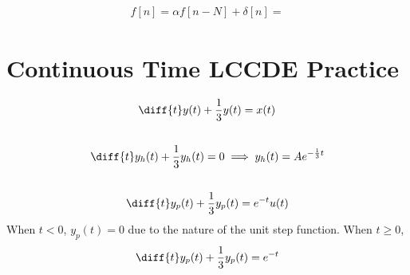 \documentclass{article}
\begin{document}
\subsection{}

\begin{align}
    f[n] = \alpha f[n - N] + \delta[n] =
\end{align}

\subsection{}

\subsection{}

\section{Continuous Time LCCDE Practice}

\begin{equation}
    \diff{t} y(t) + \frac{1}{3} y(t) = x(t)
\end{equation}

\subsection{}

\begin{equation}
    \diff{t} y_h(t) + \frac{1}{3} y_h(t) = 0 \implies y_h(t) = A e^{-\frac{1}{3} t}
\end{equation}

\subsection{}

\begin{equation}
    \diff{t} y_p(t) + \frac{1}{3} y_p(t) = e^{-t} u(t)
\end{equation}
When \(t < 0\), \(y_p(t) = 0\) due to the nature of the unit step function.
When \(t \geqslant 0\),
\begin{align}
    \diff{t} y_p(t) + \frac{1}{3} y_p(t) = e^{-t}
\end{align}

\subsection{}
\end{document}
